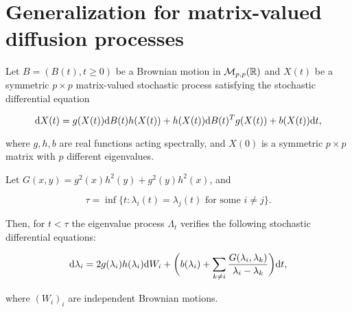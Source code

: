 \section{Generalization for matrix-valued diffusion processes} \label{sec:matrix_difusions}

\begin{theorem} \label{thm:diffusion_real}
    Let $B = (B(t), t\ge 0)$ be a Brownian motion in $\mathcal M_{p,p}(\mathbb R)$ and $X(t)$ be a symmetric $p\times p$ matrix-valued stochastic process satisfying the stochastic differential equation

    \begin{equation}
        \mathrm d X(t) = g(X(t)) \mathrm d B(t) h(X(t)) + h(X(t)) \mathrm d B(t)^T g(X(t)) + b(X(t))\mathrm d t, \label{eq:matrix_diffusion}
    \end{equation}

    where $g,h,b$ are real functions acting spectrally, and $X(0)$ is a symmetric $p\times p$ matrix with $p$ different eigenvalues. 

    Let $G(x,y) = g^2(x)h^2(y) + g^2(y)h^2(x)$, and
    
    \begin{equation}
        \tau = \inf\{ t: \lambda_i(t) = \lambda_j(t) \text{ for some } i\neq j \}. \label{eq:collision_time}
    \end{equation} 
    
    Then, for $t < \tau$ the eigenvalue process $\Lambda_t$ verifies the following stochastic differential equations:

    \begin{equation}
        \mathrm d \lambda_i = 2g(\lambda_i)h(\lambda_i)\mathrm d W_i + \biggl( b(\lambda_i) + \sum_{k\neq i} \frac{G(\lambda_i,\lambda_k)}{\lambda_i - \lambda_k} \biggr)\mathrm d t, \label{eq:gen_dyson}
    \end{equation}

    \noindent where $(W_i)_{i}$ are independent Brownian motions.
\end{theorem}

